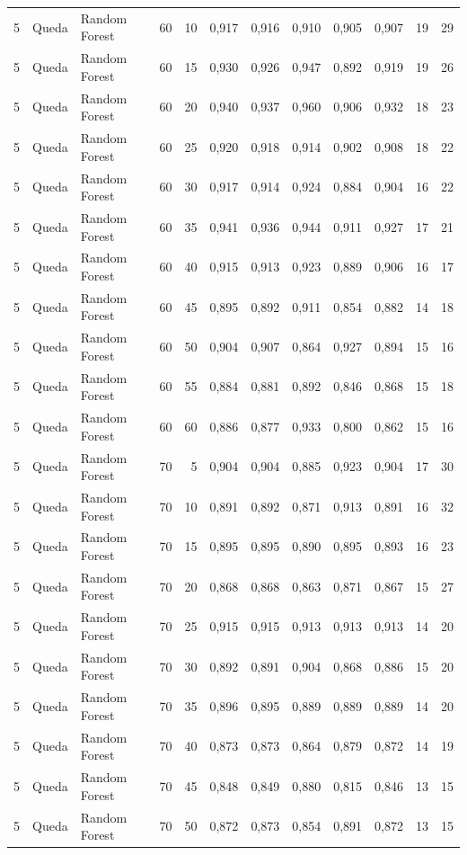 \begin{longtable}{@{}rllrrrrrrrrr@{}}
5 & Queda & Random Forest & 60 & 10 & 0,917 & 0,916 & 0,910 & 0,905 & 0,907 & 19 & 29 \\
5 & Queda & Random Forest & 60 & 15 & 0,930 & 0,926 & 0,947 & 0,892 & 0,919 & 19 & 26 \\
5 & Queda & Random Forest & 60 & 20 & 0,940 & 0,937 & 0,960 & 0,906 & 0,932 & 18 & 23 \\
5 & Queda & Random Forest & 60 & 25 & 0,920 & 0,918 & 0,914 & 0,902 & 0,908 & 18 & 22 \\
5 & Queda & Random Forest & 60 & 30 & 0,917 & 0,914 & 0,924 & 0,884 & 0,904 & 16 & 22 \\
5 & Queda & Random Forest & 60 & 35 & 0,941 & 0,936 & 0,944 & 0,911 & 0,927 & 17 & 21 \\
5 & Queda & Random Forest & 60 & 40 & 0,915 & 0,913 & 0,923 & 0,889 & 0,906 & 16 & 17 \\
5 & Queda & Random Forest & 60 & 45 & 0,895 & 0,892 & 0,911 & 0,854 & 0,882 & 14 & 18 \\
5 & Queda & Random Forest & 60 & 50 & 0,904 & 0,907 & 0,864 & 0,927 & 0,894 & 15 & 16 \\
5 & Queda & Random Forest & 60 & 55 & 0,884 & 0,881 & 0,892 & 0,846 & 0,868 & 15 & 18 \\
5 & Queda & Random Forest & 60 & 60 & 0,886 & 0,877 & 0,933 & 0,800 & 0,862 & 15 & 16 \\
5 & Queda & Random Forest & 70 & 5 & 0,904 & 0,904 & 0,885 & 0,923 & 0,904 & 17 & 30 \\
5 & Queda & Random Forest & 70 & 10 & 0,891 & 0,892 & 0,871 & 0,913 & 0,891 & 16 & 32 \\
5 & Queda & Random Forest & 70 & 15 & 0,895 & 0,895 & 0,890 & 0,895 & 0,893 & 16 & 23 \\
5 & Queda & Random Forest & 70 & 20 & 0,868 & 0,868 & 0,863 & 0,871 & 0,867 & 15 & 27 \\
5 & Queda & Random Forest & 70 & 25 & 0,915 & 0,915 & 0,913 & 0,913 & 0,913 & 14 & 20 \\
5 & Queda & Random Forest & 70 & 30 & 0,892 & 0,891 & 0,904 & 0,868 & 0,886 & 15 & 20 \\
5 & Queda & Random Forest & 70 & 35 & 0,896 & 0,895 & 0,889 & 0,889 & 0,889 & 14 & 20 \\
5 & Queda & Random Forest & 70 & 40 & 0,873 & 0,873 & 0,864 & 0,879 & 0,872 & 14 & 19 \\
5 & Queda & Random Forest & 70 & 45 & 0,848 & 0,849 & 0,880 & 0,815 & 0,846 & 13 & 15 \\
5 & Queda & Random Forest & 70 & 50 & 0,872 & 0,873 & 0,854 & 0,891 & 0,872 & 13 & 15 \\

\end{longtable}
